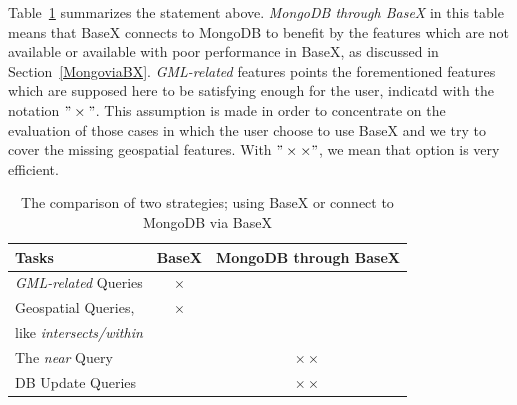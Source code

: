 \documentclass[a4paper,12pt]{article}
\begin{document}


Table~\ref{t.comparisonBaseXMongo} summarizes the statement above. \textit{MongoDB through BaseX} in this table means that BaseX connects to MongoDB to benefit by the features which are not available or available with poor performance in BaseX, as discussed in Section~\ref{MongoviaBX}. \textit{GML-related} features points the forementioned features which are supposed here to be satisfying enough for the user, indicatd with the notation $"\times"$. This assumption is made in order to concentrate on the evaluation of those cases in which the user choose to use BaseX and we try to cover the missing geospatial features.
With $"\times\times"$, we mean that option is very efficient.
\vspace{10px}
\begin{table}
\centering
\begin{tabular}{|l | c | c|}\hline
\textbf{Tasks} & \textbf{BaseX} & \textbf{MongoDB through BaseX}\\\hline
 \textit{GML-related} Queries & $\times$ &\\\hline
 Geospatial Queries,  & $\times$ &\\
like \textit{intersects/within} & & \\\hline
 The \textit{near} Query & &$\times\times$ \\\hline
 DB Update Queries & &$\times\times$ 
\\\hline
\end{tabular}
\caption{The comparison of two strategies; using BaseX or connect to MongoDB via BaseX}
\label{t.comparisonBaseXMongo}
\end{table}
\vspace{10px}
\end{document}
